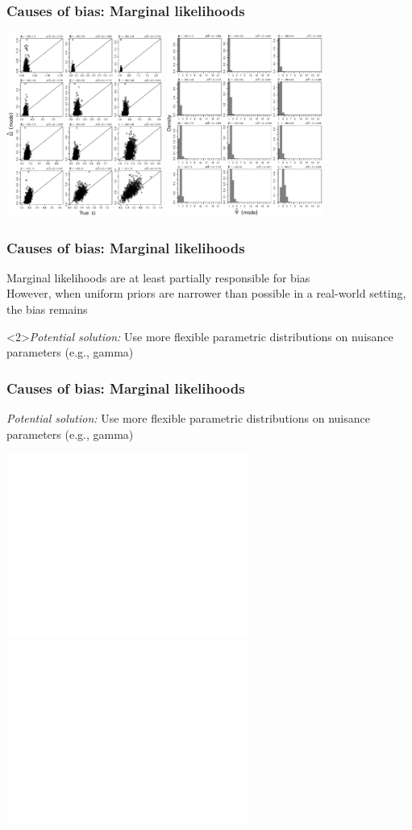 \begin{frame}
    \frametitle{Causes of bias: Marginal likelihoods}
    \begin{center}
        \includegraphics[height=6cm]{images/SS_accuracy_omega_modes_GLM_inform10.pdf} \quad
        \includegraphics[height=6cm]{images/SS_power_psi_modes_GLM_inform10.pdf}
    \end{center}
\end{frame}

\begin{frame}
    \frametitle{Causes of bias: Marginal likelihoods}
    Marginal likelihoods are at least partially responsible for bias\\
    \bigskip
    However, when uniform priors are narrower than possible in a real-world
    setting, the bias remains
    \bigskip
    \begin{block}<2>{\it Potential solution:}
        Use more flexible parametric distributions on nuisance parameters (e.g., gamma)
    \end{block}
\end{frame}

\begin{frame}
    \frametitle{Causes of bias: Marginal likelihoods}
    \begin{block}{\it Potential solution:}
        Use more flexible parametric distributions on nuisance parameters (e.g., gamma)
    \end{block}
    \smallskip
    \centerline{
        \includegraphics<1>[height=6.0cm]{images/marginal-plot-2d-uniform-prior.pdf}
        \includegraphics<2>[height=6.0cm]{images/marginal-plot-2d.pdf}}
\end{frame}


